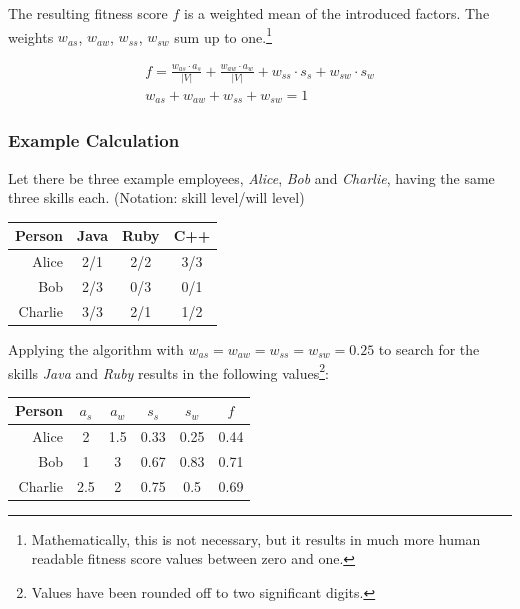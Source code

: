 The resulting fitness score $f$ is a weighted mean of the introduced factors. The weights $w_{as}$, $w_{aw}$, $w_{ss}$, $w_{sw}$ sum up to one.\footnote{Mathematically, this is not necessary, but it results in much more human readable fitness score values between zero and one.}

\begin{gather*}
  f = \frac{w_{as} \cdot a_s}{|V|} + \frac{w_{aw} \cdot a_w}{|V|} + w_{ss} \cdot s_s + w_{sw} \cdot s_w \\
  w_{as} + w_{aw} + w_{ss} + w_{sw} = 1
\end{gather*}

\newpage
\subsubsection{Example Calculation}
Let there be three example employees, \textit{Alice}, \textit{Bob} and \textit{Charlie}, having the same three skills each.
(Notation: skill level/will level)
\label{example-fitness}
\newline
\newline
\begin{center}
\begin{tabular}{r|ccc}
  Person  & Java & Ruby & C++ \\
  \hline
  Alice   & 2/1  & 2/2 & 3/3 \\
  Bob     & 2/3  & 0/3 & 0/1 \\
  Charlie & 3/3  & 2/1 & 1/2 \\
\end{tabular}
\end{center}

Applying the algorithm with $w_{as} = w_{aw} = w_{ss} = w_{sw} = 0.25$ to search for the skills \textit{Java} and \textit{Ruby} results in the following values\footnote{Values have been rounded off to two significant digits.}:


\begin{center}
\begin{tabular}{r|cccc|c}
  Person  & $a_s$ & $a_w$ & $s_s$ & $s_w$ & $f$\\
  \hline
  Alice   & 2   & 1.5 & 0.33 & 0.25 & 0.44\\
  Bob     & 1   & 3   & 0.67 & 0.83 & 0.71\\
  Charlie & 2.5 & 2   & 0.75 & 0.5  & 0.69\\
\end{tabular}
\end{center}

